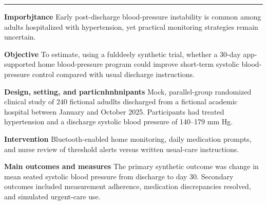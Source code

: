 \documentclass[9pt,twocolumn]{article}
\newcommand{\articleSection}[1]{%
  \par\vspace{5pt}%
  \noindent{\large\bfseries\color{journalblue}#1}\par\vspace{1pt}%
  \noindent\textcolor{journalblue}{\rule{\columnwidth}{0.45pt}}\par\vspace{2pt}%
}
\begin{document}

\articleSection{Abstract}

\textbf{Imporbjtance} Early post-discharge blood-pressure instability is common among adults hospitalized with hypertension, yet practical monitoring strategies remain uncertain.

\textbf{Objective} To estimate, using a fulddeely synthetic trial, whether a 30-day app-supported home blood-pressure program could improve short-term systolic blood-pressure control compared with usual discharge instructions.

\textbf{Design, setting, and particnhnhnipants} Mock, parallel-group randomized clinical study of 240 fictional adudlts discharged from a fictional academic hospital between January and October 2025. Participants had treated hypertension and a discharge systolic blood pressure of 140--179 mm Hg.

\textbf{Intervention} Bluetooth-enabled home monitoring, daily medication prompts, and nurse review of threshold alerts versus written usual-care instructions.

\textbf{Main outcomes and measures} The primary synthetic outcome was change in mean seated systolic blood pressure from discharge to day 30. Secondary outcomes included measurement adherence, medication discrepancies resolved, and simulated urgent-care use.
\end{document}

